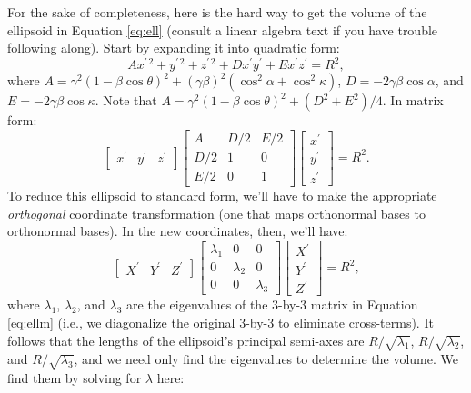 \documentclass[12pt]{article}
\begin{document}
For the sake of completeness, here is the hard way to get the volume of the ellipsoid in Equation \ref{eq:ell} (consult a linear algebra text if you have trouble following along). Start by expanding it into quadratic form:
\begin{equation*}
Ax^{\prime \, 2} + y^{\prime \, 2} + z^{\prime \, 2} + D x^\prime y^\prime + E x^\prime z^\prime = R^2,
\end{equation*}
where $A = \gamma^2 (1 - \beta \cos \theta)^2 + (\gamma \beta)^2 ( \cos^2 \alpha + \cos^2 \kappa )$, $D = -2 \gamma \beta \cos \alpha$, and $E = -2 \gamma \beta \cos \kappa$. Note that $A = \gamma^2 (1 - \beta \cos \theta)^2 + (D^2 + E^2)/4$. In matrix form:
\begin{equation}\label{eq:ellm}
\begin{bmatrix}
x^\prime & y^\prime & z^\prime
\end{bmatrix}
\begin{bmatrix}
A & D/2 & E/2 \\
D/2 & 1 & 0 \\
E/2 & 0 & 1
\end{bmatrix}
\begin{bmatrix}
x^\prime \\
y^\prime \\
z^\prime
\end{bmatrix}
= R^2 .
\end{equation}
To reduce this ellipsoid to standard form, we'll have to make the appropriate \emph{orthogonal} coordinate transformation (one that maps orthonormal bases to orthonormal bases). In the new coordinates, then, we'll have:
\begin{equation*}
\begin{bmatrix}
X^\prime & Y^\prime & Z^\prime
\end{bmatrix}
\begin{bmatrix}
\lambda_1 & 0 & 0 \\
0 & \lambda_2 & 0 \\
0 & 0 & \lambda_3
\end{bmatrix}
\begin{bmatrix}
X^\prime \\
Y^\prime \\
Z^\prime
\end{bmatrix}
= R^2 ,
\end{equation*}
where $\lambda_1$, $\lambda_2$, and $\lambda_3$ are the eigenvalues of the 3-by-3 matrix in Equation \ref{eq:ellm} (i.e., we diagonalize the original 3-by-3 to eliminate cross-terms). It follows that the lengths of the ellipsoid's principal semi-axes are $R / \sqrt{\lambda_1}$, $R / \sqrt{\lambda_2}$, and $R / \sqrt{\lambda_3}$, and we need only find the eigenvalues to determine the volume. We find them by solving for $\lambda$ here:
\end{document}
